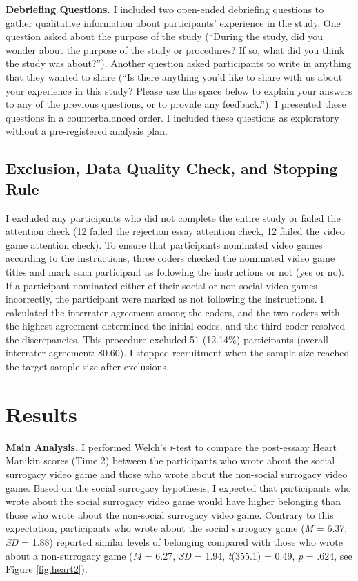 \documentclass[
]{udthesis}
\begin{document}
\textbf{Debriefing Questions.} I included two open-ended debriefing questions to gather qualitative information about participants' experience in the study. One question asked about the purpose of the study (``During the study, did you wonder about the purpose of the study or procedures? If so, what did you think the study was about?''). Another question asked participants to write in anything that they wanted to share (``Is there anything you'd like to share with us about your experience in this study? Please use the space below to explain your answers to any of the previous questions, or to provide any feedback.''). I presented these questions in a counterbalanced order. I included these questions as exploratory without a pre-registered analysis plan.

\subsection{Exclusion, Data Quality Check, and Stopping Rule}\label{exclusion-data-quality-check-and-stopping-rule}

I excluded any participants who did not complete the entire study or failed the attention check (12 failed the rejection essay attention check, 12 failed the video game attention check). To ensure that participants nominated video games according to the instructions, three coders checked the nominated video game titles and mark each participant as following the instructions or not (yes or no). If a participant nominated either of their social or non-social video games incorrectly, the participant were marked as not following the instructions. I calculated the interrater agreement among the coders, and the two coders with the highest agreement determined the initial codes, and the third coder resolved the discrepancies. This procedure excluded 51 (12.14\%) participants (overall interrater agreement: 80.60). I stopped recruitment when the sample size reached the target sample size after exclusions.

\section{Results}\label{results-5}

\textbf{Main Analysis.} I performed Welch's \emph{t}-test to compare the post-essaay Heart Manikin scores (Time 2) between the participants who wrote about the social surrogacy video game and those who wrote about the non-social surrogacy video game. Based on the social surrogacy hypothesis, I expected that participants who wrote about the social surrogacy video game would have higher belonging than those who wrote about the non-social surrogacy video game. Contrary to this expectation, participants who wrote about the social surrogacy game (\emph{M} = 6.37, \emph{SD} = 1.88) reported similar levels of belonging compared with those who wrote about a non-surrogacy game (\emph{M} = 6.27, \emph{SD} = 1.94, \emph{t}(355.1) = 0.49, \emph{p} = .624, see Figure \ref{fig:heart2}).
\end{document}
